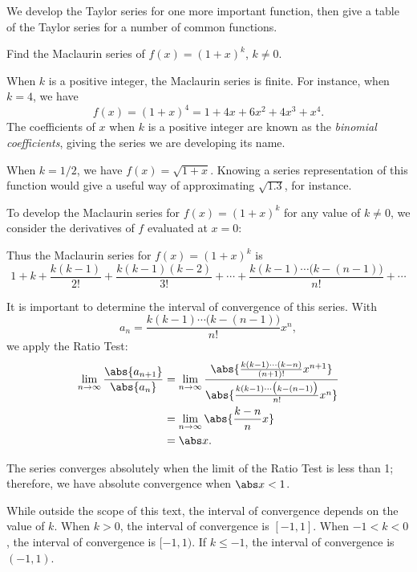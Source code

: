 We develop the Taylor series for one more important function, then give a table of the Taylor series for a number of common functions.

{Find the Maclaurin series of $f(x) = (1+x)^k$, $k\neq 0$.}
{When $k$ is a positive integer, the Maclaurin series is finite. For instance, when $k=4$, we have 
$$f(x) = (1+x)^4 = 1+4x+6x^2+4x^3+x^4.$$
The coefficients of $x$ when $k$ is a positive integer are known as the \emph{binomial coefficients}, giving the series we are developing its name.

When $k=1/2$, we have $f(x) = \sqrt{1+x}$. Knowing a series representation of this function would give a useful way of approximating $\sqrt{1.3}$, for instance.

To develop the Maclaurin series for $f(x) = (1+x)^k$ for any value of $k\neq0$, we consider the derivatives of $f$ evaluated at $x=0$:


Thus the Maclaurin series for $f(x) = (1+x)^k$ is
$$1+ k + \frac{k(k-1)}{2!} + \frac{k(k-1)(k-2)}{3!} + \dotsb + \frac{k(k-1)\dotsm\big(k-(n-1)\big)}{n!}+\dotsb$$

It is important to determine the interval of convergence of this series. With 
$$a_n = \frac{k(k-1)\dotsm\big(k-(n-1)\big)}{n!}x^n,$$
we apply the Ratio Test:
\begin{align*}
	\lim_{n\to\infty}\frac{\abs{a_{n+1}}}{\abs{a_n}}
	&=\lim_{n\to\infty}\frac{\abs{\frac{k(k-1)\dotsm(k-n)}{(n+1)!}x^{n+1}}}{\abs{\frac{k(k-1)\dotsm\big(k-(n-1)\big)}{n!}x^n}}\\
		&=\lim_{n\to\infty} \abs{\frac{k-n}{n}x}\\
		&= \abs x.
\end{align*}

The series converges absolutely when the limit of the Ratio Test is less than 1; therefore, we have absolute convergence when $\abs x<1$. 

While outside the scope of this text, the interval of convergence depends on the value of $k$. When $k>0$, the interval of convergence is $[-1,1]$. When $-1<k<0$, the interval of convergence is $[-1,1)$. If $k\leq -1$, the interval of convergence is $(-1,1)$.
}

